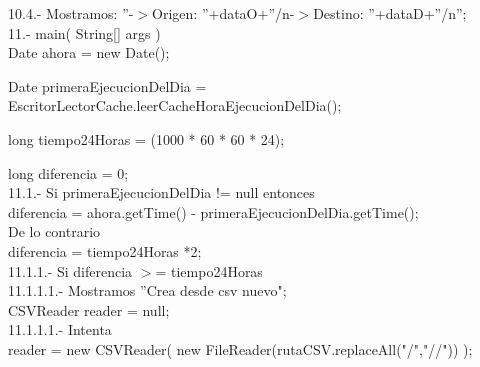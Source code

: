 \documentclass[30pt]{article}
\theoremstyle{definition}
\begin{document}
    \hspace{2cm} 10.4.- Mostramos: ''-$>$Origen: ''+dataO+''/n-$>$Destino: ''+dataD+''/n'';\\
    
    \hspace{1cm} 11.- main( String[] args )\\
    
    \hspace{2cm} Date ahora = new Date();
    
  \hspace{2cm} Date primeraEjecucionDelDia = EscritorLectorCache.leerCacheHoraEjecucionDelDia();
  
  \hspace{2cm} long tiempo24Horas = (1000 * 60 * 60 * 24);
  
  \hspace{2cm} long diferencia = 0;\\
    
    \hspace{3cm} 11.1.- Si primeraEjecucionDelDia != null entonces \\
    
    \hspace{4cm} diferencia = ahora.getTime() - primeraEjecucionDelDia.getTime();\\
    
    \hspace{5cm} De lo contrario\\
    
    \hspace{5cm} diferencia =  tiempo24Horas *2;\\
    
    \hspace{4cm} 11.1.1.- Si diferencia $>$= tiempo24Horas\\
    
    \hspace{5cm} 11.1.1.1.- Mostramos ''Crea desde csv nuevo";\\
    
    \hspace{5cm} CSVReader reader = null;\\
    
    \hspace{5cm} 11.1.1.1.- Intenta \\
    
    \hspace{6cm} reader = new CSVReader( new FileReader(rutaCSV.replaceAll("/","//")) );
\end{document}
